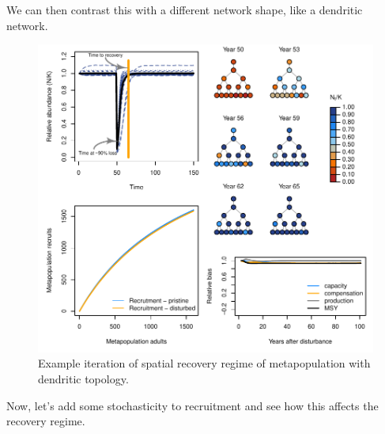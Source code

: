 \documentclass[
]{article}
\begin{document}
We can then contrast this with a different network shape, like a
dendritic network.

\begin{figure}[H]

{\centering \includegraphics{Managing_for_ecological_surprises_in_metapopulations_files/figure-latex/example results2-1} 

}

\caption{Example iteration of spatial recovery regime of metapopulation with dendritic topology.}\label{fig:example results2}
\end{figure}
\newpage

Now, let's add some stochasticity to recruitment and see how this
affects the recovery regime.
\end{document}
